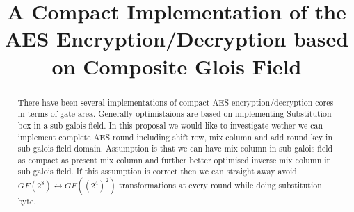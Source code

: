 \documentclass[10pt, conference, compsocconf]{IEEEtran}
\begin{document}
\title{A Compact Implementation of the AES Encryption/Decryption based on Composite Glois Field}



\author{
\and
\IEEEauthorblockN{
}
}


\maketitle



\begin{abstract}
There have been several implementations of compact AES encryption/decryption cores in terms of gate area. Generally optimistaions are based on implementing Substitution box in a sub galois field. In this proposal we would like to investigate wether we can implement complete AES round including shift row, mix column and add round key in sub galois field domain. Assumption is that we can have mix column in sub galois field as compact as present mix column and further better optimised inverse mix column in sub galois field. If this assumption is correct then we can straight away avoid $GF(2^8) \leftrightarrow GF((2^4)^2)$ transformations at every round while doing substitution byte.

\end{abstract}
\end{document}
